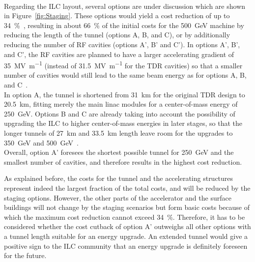 \\Regarding the ILC layout, several options are under discussion which are shown in Figure~\ref{fig:Staging}.
These options would yield a cost reduction of up to \SI{34}{\percent}~\cite{Cost_reduction}, resulting in about \SI{66}{\percent} of the initial costs for the \SI{500}{\GeV} machine by reducing the length of the tunnel (options A, B, and C), or by additionally reducing the number of RF cavities (options A', B' and C').
In options A', B', and C', the RF cavities are planned to have a larger accelerating gradient of \SI{35}{\mega\volt\per\meter} (instead of \SI{31.5}{\mega\volt\per\meter} for the TDR cavities) so that a smaller number of cavities would still lead to the same beam energy as for options A, B, and C~\cite[p. 19]{Staging}.
\\In option A, the tunnel is shortened from \SI{31}{\kilo\meter} for the original TDR design to \SI{20.5}{\kilo\meter}, fitting merely the main linac modules for a center-of-mass energy of \SI{250}{\GeV}.
Options B and C are already taking into account the possibility of upgrading the ILC to higher center-of-mass energies in later stages, so that the longer tunnels of \SI{27}{\kilo\meter} and \SI{33.5}{\kilo\meter} length leave room for the upgrades to \SI{350}{\GeV} and \SI{500}{\GeV}~\cite[p. 19]{Staging}. 
\\Overall, option A' foresees the shortest possible tunnel for \SI{250}{\GeV} and the smallest number of cavities, and therefore results in the highest cost reduction.

As explained before, the costs for the tunnel and the accelerating structures represent indeed the largest fraction of the total costs, and will be reduced by the staging options.
However, the other parts of the accelerator and the surface buildings will not change by the staging scenarios but form basic costs because of which the maximum cost reduction cannot exceed \SI{34}{\percent}.
Therefore, it has to be considered whether the cost cutback of option A' outweighs all other options with a tunnel length suitable for an energy upgrade.
An extended tunnel would give a positive sign to the ILC community that an energy upgrade is definitely foreseen for the future.

